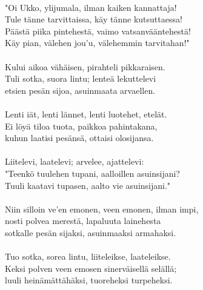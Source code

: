                                                             \\
"Oi Ukko, ylijumala, ilman kaiken kannattaja!               \\
Tule tänne tarvittaissa, käy tänne kutsuttaessa!            \\
Päästä piika pintehestä, vaimo vatsanvääntehestä!           \\
Käy pian, välehen jou'u, välehemmin tarvitahan!"            \\
                                                            \\
Kului aikoa vähäisen, pirahteli pikkaraisen.                \\
Tuli sotka, suora lintu; lenteä lekuttelevi                 \\
etsien pesän sijoa, asuinmaata arvaellen.                   \\
                                                            \\
Lenti iät, lenti lännet, lenti luotehet, etelät.            \\
Ei löyä tiloa tuota, paikkoa pahintakana,                   \\
kuhun laatisi pesänsä, ottaisi olosijansa.                  \\
                                                            \\
Liitelevi, laatelevi; arvelee, ajattelevi:                  \\
"Teenkö tuulehen tupani, aalloillen asuinsijani?            \\
Tuuli kaatavi tupasen, aalto vie asuinsijani."              \\
                                                            \\
Niin silloin ve'en emonen, veen emonen, ilman impi,         \\
nosti polvea merestä, lapaluuta lainehesta                  \\
sotkalle pesän sijaksi, asuinmaaksi armahaksi.              \\
                                                            \\
Tuo sotka, sorea lintu, liiteleikse, laateleikse.           \\
Keksi polven veen emosen sinerväisellä selällä;             \\
luuli heinämättähäksi, tuoreheksi turpeheksi.               \\
                                                            \\
